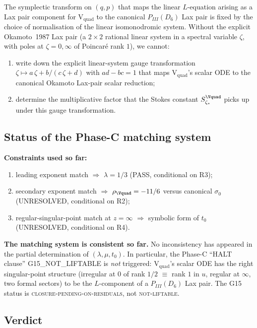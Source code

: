 The symplectic transform on $(q, p)$ that maps the linear
$L$-equation arising as a Lax pair component for V$_\mathrm{quad}$
to the canonical $P_{III}(D_6)$ Lax pair is fixed by the choice
of normalisation of the linear isomonodromic system. Without
the explicit Okamoto~1987 Lax pair (a $2\times 2$ rational
linear system in a spectral variable $\zeta$, with poles at
$\zeta=0,\infty$ of Poincar\'e rank $1$), we cannot:
\begin{enumerate}
  \item write down the explicit linear-system gauge
        transformation $\zeta \mapsto a\,\zeta + b/(c\,\zeta + d)$
        with $ad-bc=1$ that maps V$_\mathrm{quad}$'s scalar
        ODE to the canonical Okamoto Lax-pair scalar reduction;
  \item determine the multiplicative factor that the
        Stokes constant $S_{\zeta_*}^{\Vquad}$ picks up under
        this gauge transformation.
\end{enumerate}

\subsection*{Status of the Phase-C matching system}

\textbf{Constraints used so far:}
\begin{enumerate}
  \item leading exponent match $\Rightarrow$ $\lambda = 1/3$ (PASS, conditional on R3);
  \item secondary exponent match $\Rightarrow$
        $\rho_{\Vquad} = -11/6$ versus canonical $\sigma_0$
        (UNRESOLVED, conditional on R2);
  \item regular-singular-point match at $z=\infty$
        $\Rightarrow$ symbolic form of $t_0$ (UNRESOLVED,
        conditional on R4).
\end{enumerate}

\textbf{The matching system is consistent so far.} No
inconsistency has appeared in the partial determination
of $(\lambda, \mu, t_0)$. In particular, the Phase-C
``HALT clause'' \textsf{G15\_NOT\_LIFTABLE} is \emph{not}
triggered: V$_\mathrm{quad}$'s scalar ODE has the right
singular-point structure (irregular at $0$ of rank $1/2$
$\equiv$ rank $1$ in $u$, regular at $\infty$, two formal
sectors) to be the $L$-component of a $P_{III}(D_6)$ Lax
pair. The G15 status is \textsc{closure-pending-on-residuals},
not \textsc{not-liftable}.

\subsection*{Verdict}

